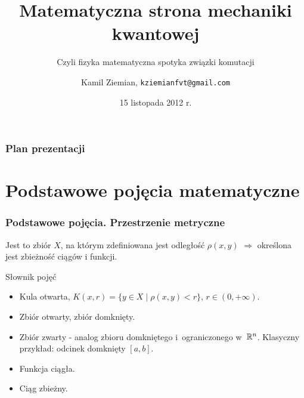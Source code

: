 \documentclass[10pt,t]{beamer}
\title{Matematyczna strona mechaniki kwantowej}
\subtitle{Czyli fizyka matematyczna spotyka związki komutacji}
\author{Kamil Ziemian,
  \texttt{kziemianfvt@gmail.com}}
\institute{II rok, fizyka teoretyczna, studia magisterskie}
\date[15.11.2012]{15 listopada 2012 r.}
\begin{document}






\RaggedRight





\maketitle %





\begin{frame}
  \frametitle{Plan prezentacji}


  \tableofcontents %

\end{frame}










\section[Podstawowe pojęcia]{Podstawowe pojęcia matematyczne}



\begin{frame}
  \frametitle{Podstawowe pojęcia. Przestrzenie metryczne}


  Jest to zbiór $X$, na którym zdefiniowana jest odległość $\rho( x, y )$ $\Rightarrow$
  określona jest zbieżność ciągów i funkcji.

  Słownik pojęć
  \begin{itemize}
    \RaggedRight

  \item Kula otwarta, $K( x, r ) = \{ y \in X \; | \; \rho( x, y ) < r \}$,
    $r \in ( 0, +\infty )$.

  \item Zbiór otwarty, zbiór domknięty.

  \item Zbiór zwarty - analog zbioru domkniętego i~ograniczonego
    w~$\mathbb{R}^{ n }$. Klasyczny przykład: odcinek domknięty $[ a, b ]$.

  \item Funkcja ciągła.

  \item Ciąg zbieżny.

\end{itemize}

\end{frame}
\end{document}

